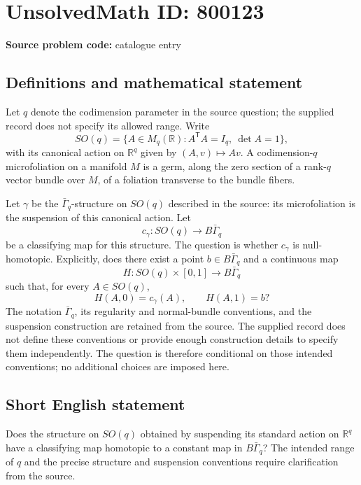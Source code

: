 \documentclass[11pt]{article}
\newcommand{\R}{\mathbb{R}}
\begin{document}
\section*{UnsolvedMath ID: 800123}
\textbf{Source problem code:} catalogue entry
\subsection{Definitions and mathematical statement}
Let \(q\) denote the codimension parameter in the source question; the supplied record does not specify its allowed range. Write
\[
SO(q)=\{A\in M_q(\R):A^{\mathsf T}A=I_q,\ \det A=1\},
\]
with its canonical action on \(\R^q\) given by \((A,v)\mapsto Av\). A codimension-\(q\) microfoliation on a manifold \(M\) is a germ, along the zero section of a rank-\(q\) vector bundle over \(M\), of a foliation transverse to the bundle fibers.

Let \(\gamma\) be the \(\bar\Gamma_q\)-structure on \(SO(q)\) described in the source: its microfoliation is the suspension of this canonical action. Let
\[
c_\gamma\colon SO(q)\longrightarrow B\bar\Gamma_q
\]
be a classifying map for this structure. The question is whether \(c_\gamma\) is null-homotopic. Explicitly, does there exist a point \(b\in B\bar\Gamma_q\) and a continuous map
\[
H\colon SO(q)\times[0,1]\longrightarrow B\bar\Gamma_q
\]
such that, for every \(A\in SO(q)\),
\[
H(A,0)=c_\gamma(A),\qquad H(A,1)=b?
\]
The notation \(\bar\Gamma_q\), its regularity and normal-bundle conventions, and the suspension construction are retained from the source. The supplied record does not define these conventions or provide enough construction details to specify them independently. The question is therefore conditional on those intended conventions; no additional choices are imposed here.
\subsection{Short English statement}
Does the structure on \(SO(q)\) obtained by suspending its standard action on \(\R^q\) have a classifying map homotopic to a constant map in \(B\bar\Gamma_q\)? The intended range of \(q\) and the precise structure and suspension conventions require clarification from the source.
\end{document}
